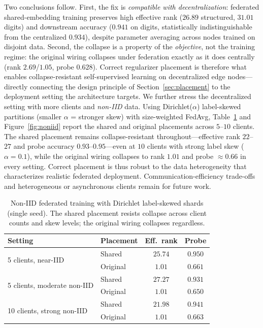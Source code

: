 Two conclusions follow. First, the fix is \emph{compatible with
decentralization}: federated shared-embedding training preserves high
effective rank ($26.89$ structured, $31.01$ digits) and downstream accuracy
($0.941$ on digits, statistically indistinguishable from the centralized
$0.934$), despite parameter averaging across nodes trained on disjoint data.
Second, the collapse is a property of the \emph{objective}, not the training
regime: the original wiring collapses under federation exactly as it does
centrally (rank $2.69$/$1.05$, probe $0.628$). Correct regularizer placement is
therefore what enables collapse-resistant self-supervised learning on
decentralized edge nodes---directly connecting the design principle of
Section~\ref{sec:placement} to the deployment setting the architecture targets.
We further stress the decentralized setting with more clients and
\emph{non-IID} data. Using Dirichlet($\alpha$) label-skewed partitions (smaller
$\alpha$ = stronger skew) with size-weighted FedAvg, Table~\ref{tab:noniid} and
Figure~\ref{fig:noniid} report the shared and original placements across
$5$--$10$ clients. The shared placement remains collapse-resistant
throughout---effective rank $22$--$27$ and probe accuracy $0.93$--$0.95$---even
at $10$ clients with strong label skew ($\alpha = 0.1$), while the original
wiring collapses to rank $1.01$ and probe $\approx 0.66$ in every setting.
Correct placement is thus robust to the data heterogeneity that characterizes
realistic federated deployment. Communication-efficiency trade-offs and
heterogeneous or asynchronous clients remain for future work.

\begin{table}[htbp]
    \centering
    \caption{Non-IID federated training with Dirichlet label-skewed shards
    (single seed). The shared placement resists collapse across client counts
    and skew levels; the original wiring collapses regardless.}
    \label{tab:noniid}
    \begin{tabular}{llcc}
        \toprule
        \textbf{Setting} & \textbf{Placement} & \textbf{Eff.\ rank} & \textbf{Probe} \\
        \midrule
        \multirow{2}{*}{5 clients, near-IID}
          & Shared   & $25.74$ & $0.950$ \\
          & Original & $\mathbf{1.01}$ & $0.661$ \\
        \midrule
        \multirow{2}{*}{5 clients, moderate non-IID}
          & Shared   & $27.27$ & $0.931$ \\
          & Original & $\mathbf{1.01}$ & $0.650$ \\
        \midrule
        \multirow{2}{*}{10 clients, strong non-IID}
          & Shared   & $21.98$ & $0.941$ \\
          & Original & $\mathbf{1.01}$ & $0.663$ \\
        \bottomrule
    \end{tabular}
\end{table}

